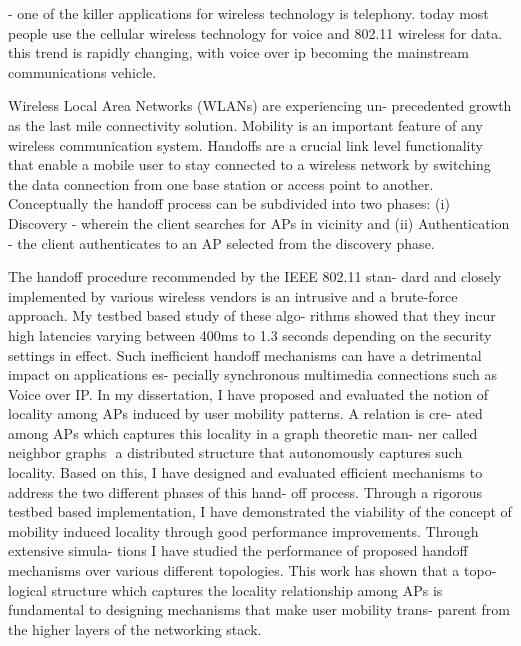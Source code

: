 \documentclass[10pt,letterpaper]{article}
\begin{document}
- one of the killer applications for wireless technology is telephony. today 
most people use the cellular wireless technology for voice and 802.11 wireless
for data. this trend is rapidly changing, with voice over ip becoming the mainstream
communications vehicle. 

Wireless Local Area Networks (WLANs) are experiencing un-
precedented growth as the last mile connectivity solution. Mobility is
an important feature of any wireless communication system. Handoffs
are a crucial link level functionality that enable a mobile user to stay
connected to a wireless network by switching the data connection from
one base station or access point to another. Conceptually the handoff
process can be subdivided into two phases: (i) Discovery - wherein the
client searches for APs in vicinity and (ii) Authentication - the client
authenticates to an AP selected from the discovery phase.


       The handoff procedure recommended by the IEEE 802.11 stan-
dard and closely implemented by various wireless vendors is an intrusive
and a brute-force approach. My testbed based study of these algo-
rithms showed that they incur high latencies varying between 400ms to
1.3 seconds depending on the security settings in effect. Such inefficient
handoff mechanisms can have a detrimental impact on applications es-
pecially synchronous multimedia connections such as Voice over IP.
       In my dissertation, I have proposed and evaluated the notion of
locality among APs induced by user mobility patterns. A relation is cre-
ated among APs which captures this locality in a graph theoretic man-
ner called neighbor graphs ­ a distributed structure that autonomously
captures such locality. Based on this, I have designed and evaluated
efficient mechanisms to address the two different phases of this hand-
off process. Through a rigorous testbed based implementation, I have
demonstrated the viability of the concept of mobility induced locality
through good performance improvements. Through extensive simula-
tions I have studied the performance of proposed handoff mechanisms
over various different topologies. This work has shown that a topo-
logical structure which captures the locality relationship among APs is
fundamental to designing mechanisms that make user mobility trans-
parent from the higher layers of the networking stack.

\fi

%
%
\end{document}
